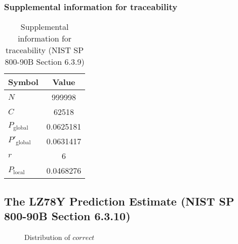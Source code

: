 \documentclass[a3paper,xelatex,english]{bxjsarticle}
\begin{document}
\subsubsection{Supplemental information for traceability}
\renewcommand{\arraystretch}{1.8}
\begin{table}[h]
\caption{Supplemental information for traceability (NIST SP 800-90B Section 6.3.9)}
\begin{center}
\begin{tabular}{|l|c|}
\hline 
\rowcolor{anotherlightblue} %
Symbol				& Value \\ \hline 
$N$				& 999998\\ \hline 
$C$				& 62518\\ \hline 
$P_{\textrm{global}}$				& 0.0625181\\ \hline 
$P'_{\textrm{global}}$			& 0.0631417\\ \hline 
$r$				& 6\\ \hline 
$P_{\textrm{local}}$ 			& 0.0468276\\ \hline
\end{tabular}
\end{center}
\end{table}
\renewcommand{\arraystretch}{1.4}
\clearpage
\subsection{The LZ78Y Prediction Estimate (NIST SP 800-90B Section 6.3.10)}\label{sec:NonBinary6310}

\begin{figure}[htbp]
\centering

\caption{Distribution of $correct$}
\end{figure}
\end{document}
